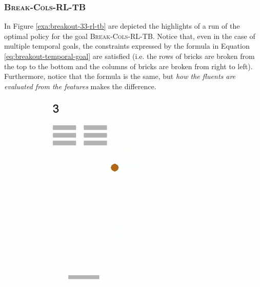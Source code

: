 \subsubsection{\textsc{Break-Cols-RL-TB}}
In Figure \ref{exa:breakout-33-rl-tb} are depicted the highlights of a run of the optimal policy for the goal \textsc{Break-Cols-RL-TB}. Notice that, even in the case of multiple temporal goals, the constraints expressed by the formula in Equation \ref{eq:breakout-temporal-goal} are satisfied (i.e. the rows of bricks are broken from the top to the bottom and the columns of bricks are broken from right to left). Furthermore, notice that the formula is the same, but \emph{how the fluents are evaluated from the features}  makes the difference.


\begin{figure}[h]
	\centering
	\begin{subfigure}[b]{0.18\textwidth}
		\includegraphics[width=\textwidth]{images/breakout-33-rl-tb-1.png}

\end{subfigure}
\end{figure}
